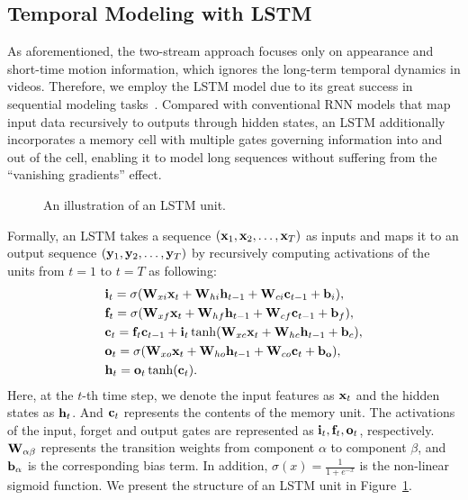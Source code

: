 \documentclass[journal]{IEEEtran}
\begin{document}
\subsection{Temporal Modeling with LSTM}
As aforementioned, the two-stream approach focuses only on appearance and short-time motion information, which ignores the long-term temporal dynamics in videos. Therefore, we employ the LSTM model due to its great success in sequential modeling tasks~\cite{DBLP:conf/icassp/GravesMH13,Donahue2015,Yao2015}. Compared with conventional RNN models that map input data recursively to outputs through hidden states, an LSTM additionally incorporates a memory cell with multiple gates governing information into and out of the cell, enabling it to model long sequences without suffering from the ``vanishing gradients'' effect.





\begin{figure}[t]
\centering
{}
\caption{\label{fig:lstmunit}An illustration of an LSTM unit.}
\end{figure}

Formally, an LSTM takes a sequence $({\bf x}_1,{\bf x}_2,\ldots,{\bf x}_T)$ as inputs and maps it to an output sequence  $({\bf y}_1,{\bf y}_2,\ldots,{\bf y}_T)$ by recursively computing activations of the units from $t=1$ to $t = T$ as following:
\begin{align*} 
& {\bf i}_t=\sigma({\bf W}_{xi}{\bf x}_t+{\bf W}_{hi}{\bf h}_{t-1}+{\bf W}_{ci}{\bf c}_{t-1}+{\bf b}_i), \\ 
& {\bf f}_t=\sigma({\bf W}_{xf}{\bf x}_t+{\bf W}_{hf}{\bf h}_{t-1}+{\bf W}_{cf}{\bf c}_{t-1}+{\bf b}_f), \\
& {\bf c}_t={\bf f}_t{\bf c}_{t-1}+{\bf i}_t\tanh({\bf W}_{xc}{\bf x}_t+{\bf W}_{hc}{\bf h}_{t-1}+{\bf b}_c), \\
& {\bf o}_t=\sigma({\bf W}_{xo}{\bf x}_t+{\bf W}_{ho}{\bf h}_{t-1}+{\bf W}_{co}{\bf c}_{t}+{\bf b_o}), \\
& {\bf h}_t={\bf o}_t\tanh({\bf c}_t).
\end{align*}
Here, at the $t$-th time step, we denote the input features as ${\bf x}_t$ and the hidden states as ${\bf h}_t$. And ${\bf c}_t$ represents the contents of the memory unit. The activations of the input, forget and output gates are represented as ${\bf i}_t, {\bf f}_t, {\bf o}_t$, respectively.
${\bf W}_{\alpha\beta}$ represents the transition weights from component $\alpha$ to component $\beta$, and ${\bf b}_\alpha$ is the corresponding bias term. In addition, $\sigma(x) = \frac{1}{1+e^{-x}}$ is the non-linear sigmoid function. We present the structure of an LSTM unit in Figure~\ref{fig:lstmunit}.
\end{document}
